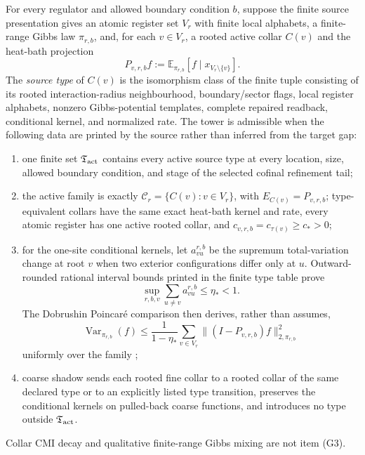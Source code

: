 \begin{definition}
\label{def:admissible-atomic-collar-tower}
For every regulator and allowed boundary condition \(b\), suppose the finite source presentation
gives an atomic register set \(V_r\) with finite local alphabets, a finite-range Gibbs law \(\pi_{r,b}\), and, for each
\(v\in V_r\), a rooted active collar \(C(v)\) and the heat-bath projection
\[
P_{v,r,b}f:=\mathbb E_{\pi_{r,b}}[f\mid x_{V_r\setminus\{v\}}].
\]
The \emph{source type} of \(C(v)\) is the isomorphism class of the finite tuple consisting of its
rooted interaction-radius neighbourhood, boundary/sector flags, local register alphabets,
nonzero Gibbs-potential templates, complete repaired readback, conditional kernel, and normalized
rate.  The tower is admissible when the following data are printed by the source rather than
inferred from the target gap:
\begin{enumerate}[label=\textup{(G\arabic*)},leftmargin=2em]
\item one finite set \(\mathfrak T_{\rm act}\) contains every active source type at every
location, size, allowed boundary condition, and stage of the selected cofinal refinement tail;
\item the active family is exactly \(\mathcal C_r=\{C(v):v\in V_r\}\), with
\(E_{C(v)}=P_{v,r,b}\); type-equivalent collars have the same exact heat-bath kernel and rate,
every atomic register has one active rooted collar, and
\(c_{v,r,b}=c_{\tau(v)}\ge c_*>0\);
\item for the one-site conditional kernels, let \(a_{vu}^{r,b}\) be the supremum total-variation
change at root \(v\) when two exterior configurations differ only at \(u\).  Outward-rounded
rational interval bounds printed in the finite type table prove
\[
\sup_{r,b,v}\sum_{u\ne v}a_{vu}^{r,b}\le\eta_*<1.
\tag{INF}
\]
The Dobrushin Poincar\'e comparison then derives, rather than assumes,
\[
\operatorname{Var}_{\pi_{r,b}}(f)
\le\frac{1}{1-\eta_*}\sum_{v\in V_r}\|(I-P_{v,r,b})f\|_{2,\pi_{r,b}}^2
\tag{AT}
\]
uniformly over the family \cite{wuDobrushin06};
\item coarse shadow sends each rooted fine collar to a rooted collar of the same declared type or
to an explicitly listed type transition, preserves the conditional kernels on pulled-back coarse
functions, and introduces no type outside \(\mathfrak T_{\rm act}\).
\end{enumerate}
Collar CMI decay and qualitative finite-range Gibbs mixing are not item \textup{(G3)}.
\end{definition}

